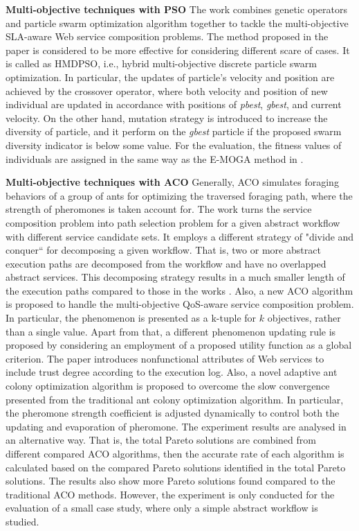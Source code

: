 \textbf{Multi-objective techniques with PSO} The work \cite{yin2014hybrid} combines genetic operators and particle swarm optimization algorithm together to tackle the multi-objective SLA-aware Web service composition problems. The method proposed in the paper  is considered to be more effective for  considering different scare of cases.  It is called as HMDPSO, i.e., hybrid multi-objective discrete particle swarm optimization. In particular, the updates of particle's velocity and position are achieved by the crossover operator, where both velocity and position of new individual are updated in accordance with positions of \textit{pbest}, \textit{gbest}, and current velocity. On the other hand, mutation strategy is introduced to increase the diversity of particle, and it perform on the \textit{gbest} particle if the proposed swarm diversity indicator is below some value. For the evaluation,  the fitness values of individuals are assigned in the same way as the E-MOGA method in \cite{wada2012e3}.

\textbf{Multi-objective techniques with ACO} Generally, ACO simulates foraging behaviors of a group of ants for optimizing the traversed foraging path, where the strength of pheromones is taken account for. The work \cite{zhang2010qos} turns the service composition problem into path selection problem for a given abstract workflow with different service candidate sets. It employs a different strategy of "divide and conquer`` for decomposing a given workflow. That is,  two or more abstract execution paths are decomposed from the workflow and have no overlapped abstract services. This decomposing strategy results in a much smaller length of the execution paths compared to those in the works \cite{yu2007efficient}.  Also, a new ACO algorithm is proposed to handle the multi-objective QoS-aware service composition problem. In particular,  the phenomenon is presented as a k-tuple for $k$ objectives, rather than a single value. Apart from that, a different phenomenon updating rule is proposed by considering an employment of a proposed utility function as a global criterion. The paper \cite{wang2014novel} introduces nonfunctional attributes of Web services to include trust degree according to the execution log. Also, a novel adaptive ant colony optimization algorithm is proposed to overcome the slow convergence presented from the traditional ant colony optimization algorithm. In particular, the pheromone strength coefficient is adjusted dynamically to control both the updating and evaporation of pheromone. The experiment results are analysed in an alternative way. That is, the total Pareto solutions are combined from different compared ACO algorithms, then the accurate rate of each algorithm is calculated based on the compared Pareto solutions identified in the total Pareto solutions. The results also show more Pareto solutions found compared to the traditional ACO methods. However, the experiment is only conducted for the evaluation of a small case study, where only a simple abstract workflow is studied.

